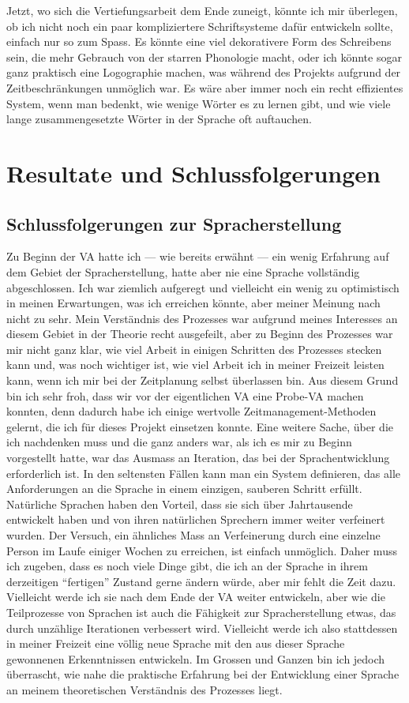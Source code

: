 \documentclass{article}
\begin{document}
Jetzt, wo sich die Vertiefungsarbeit dem Ende zuneigt, könnte ich mir überlegen, ob ich nicht noch ein paar
kompliziertere Schriftsysteme dafür entwickeln sollte, einfach nur so zum Spass. Es könnte eine viel dekorativere
Form des Schreibens sein, die mehr Gebrauch von der starren Phonologie macht, oder ich könnte sogar ganz praktisch
eine Logographie machen, was während des Projekts aufgrund der Zeitbeschränkungen unmöglich war.
Es wäre aber immer noch ein recht effizientes System, wenn man bedenkt, wie wenige Wörter es zu lernen gibt,
und wie viele lange zusammengesetzte Wörter in der Sprache oft auftauchen.




\section{Resultate und Schlussfolgerungen}
\subsection{Schlussfolgerungen zur Spracherstellung}
Zu Beginn der VA hatte ich --- wie bereits erwähnt --- ein wenig Erfahrung auf dem Gebiet der Spracherstellung,
hatte aber nie eine Sprache vollständig abgeschlossen. Ich war ziemlich aufgeregt und vielleicht ein wenig
zu optimistisch in meinen Erwartungen, was ich erreichen könnte, aber meiner Meinung nach nicht zu sehr.
Mein Verständnis des Prozesses war aufgrund meines Interesses an diesem Gebiet in der Theorie recht ausgefeilt,
aber zu Beginn des Prozesses war mir nicht ganz klar, wie viel Arbeit in einigen Schritten des Prozesses stecken
kann und, was noch wichtiger ist, wie viel Arbeit ich in meiner Freizeit leisten kann,
wenn ich mir bei der Zeitplanung selbst überlassen bin. Aus diesem Grund bin ich sehr froh,
dass wir vor der eigentlichen VA eine Probe-VA machen konnten, denn dadurch habe ich einige wertvolle
Zeitmanagement-Methoden gelernt, die ich für dieses Projekt einsetzen konnte. Eine weitere Sache,
über die ich nachdenken muss und die ganz anders war, als ich es mir zu Beginn vorgestellt hatte,
war das Ausmass an Iteration, das bei der Sprachentwicklung erforderlich ist.
In den seltensten Fällen kann man ein System definieren, das alle Anforderungen an die Sprache in einem einzigen,
sauberen Schritt erfüllt. Natürliche Sprachen haben den Vorteil, dass sie sich über Jahrtausende entwickelt
haben und von ihren natürlichen Sprechern immer weiter verfeinert wurden. Der Versuch,
ein ähnliches Mass an Verfeinerung durch eine einzelne Person im Laufe einiger Wochen zu erreichen,
ist einfach unmöglich. Daher muss ich zugeben, dass es noch viele Dinge gibt,
die ich an der Sprache in ihrem derzeitigen ``fertigen'' Zustand gerne ändern würde,
aber mir fehlt die Zeit dazu. Vielleicht werde ich sie nach dem Ende der VA weiter entwickeln,
aber wie die Teilprozesse von Sprachen ist auch die Fähigkeit zur Spracherstellung etwas,
das durch unzählige Iterationen verbessert wird. Vielleicht werde ich also stattdessen in meiner
Freizeit eine völlig neue Sprache mit den aus dieser Sprache gewonnenen Erkenntnissen entwickeln.
Im Grossen und Ganzen bin ich jedoch überrascht, wie nahe die praktische Erfahrung bei der Entwicklung
einer Sprache an meinem theoretischen Verständnis des Prozesses liegt.
\end{document}
